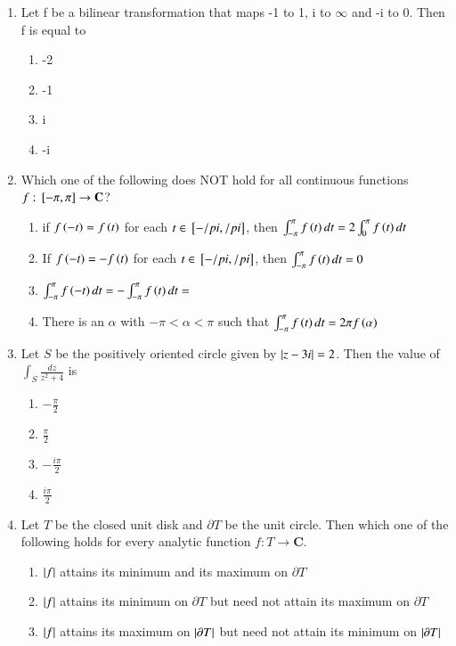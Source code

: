 \documentclass[journal]{IEEEtran}
\numberwithin{equation}{enumi}
\numberwithin{figure}{enumi}
\begin{document}
\begin{enumerate}[start=18]
\item Let f be a bilinear transformation that maps -1 to 1, i to $\infty$ and -i to 0. Then f is equal to
\begin{enumerate}
\item -2
\item -1
\item i
\item -i
\end{enumerate}
\item Which one of the following does NOT hold for all continuous functions $f:{}\left[-\pi,\pi\right]\rightarrow\mathbf{C}$?
\begin{enumerate}
\item if $f\left(-t\right)=f\left(t\right)$ for each $t \in {}\left[-/pi,/pi\right]$, then $\int_{-\pi}^\pi f\left(t\right) dt=2\int_{0}^\pi f\left(t\right) dt$
\item If $f\left(-t\right)=-f\left(t\right)$ for each $t \in {}\left[-/pi,/pi\right]$, then $\int_{-\pi}^\pi f\left(t\right) dt=0$
\item $\int_{-\pi}^\pi f\left(-t\right) dt=-\int_{-\pi}^\pi f\left(t\right) dt=$
\item There is an $\alpha$ with $-\pi<\alpha<\pi$ such that $\int_{-\pi}^\pi f\left(t\right) dt= 2\pi f\left(\alpha\right)$
\end{enumerate}
    \item Let  $S$ be the positively oriented circle given by $\left\vert z - 3i\right\vert = 2 $. Then the value of $\int_{S} \frac{dz}{z^2 + 4}$ is
    \begin{enumerate}
        \item $-\frac{\pi}{2} $
        \item $ \frac{\pi}{2} $
        \item $ -\frac{i\pi}{2} $
        \item $ \frac{i\pi}{2} $
    \end{enumerate}
    \item Let $T$ be the closed unit disk and $\partial T$ be the unit circle. Then which one of the following holds for every analytic function $f : T \to \mathbf{C} $.
    \begin{enumerate}
        \item $\left\vert f\right\vert$ attains its minimum and its maximum on $\partial T$
        \item $\left\vert f\right\vert$ attains its minimum on $\partial T$ but need not attain its maximum on $\partial T$
        \item $\left\vert f\right\vert$ attains its maximum on $\left\vert \partial T\right\vert$ but need not attain its minimum on $\left\vert \partial T \right\vert$

\end{enumerate}
\end{enumerate}
\end{document}
